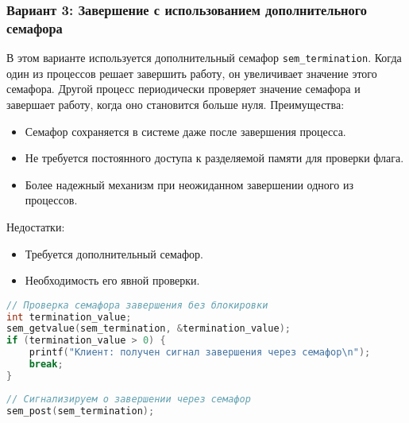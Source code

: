 \documentclass[a4paper,12pt]{article}
\begin{document}
\subsubsection{Вариант 3: Завершение с использованием дополнительного семафора}
В этом варианте используется дополнительный семафор \texttt{sem\_termination}. Когда один из процессов решает завершить работу, он увеличивает значение этого семафора. Другой процесс периодически проверяет значение семафора и завершает работу, когда оно становится больше нуля.
Преимущества:
\begin{itemize}
    \item Семафор сохраняется в системе даже после завершения процесса.
    \item Не требуется постоянного доступа к разделяемой памяти для проверки флага.
    \item Более надежный механизм при неожиданном завершении одного из процессов.
\end{itemize}
Недостатки:
\begin{itemize}
    \item Требуется дополнительный семафор.
    \item Необходимость его явной проверки.
\end{itemize}
\begin{lstlisting}[language=C, caption=Проверка семафора завершения]
// Проверка семафора завершения без блокировки
int termination_value;
sem_getvalue(sem_termination, &termination_value);
if (termination_value > 0) {
    printf("Клиент: получен сигнал завершения через семафор\n");
    break;
}
\end{lstlisting}
\begin{lstlisting}[language=C, caption=Сигнализация о завершении через семафор]
// Сигнализируем о завершении через семафор
sem_post(sem_termination);
\end{lstlisting}
\end{document}
